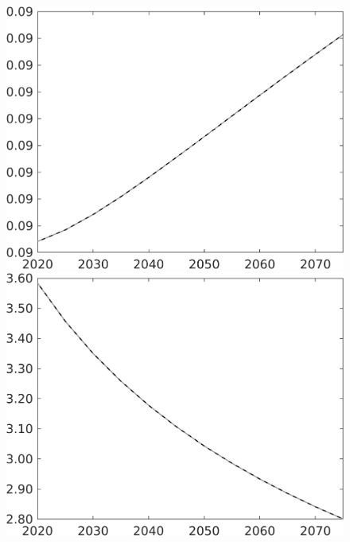 \documentclass[12pt]{article}
\begin{document}
\begin{figure}[h!!]
\begin{minipage}[]{0.32\textwidth}
	\end{minipage}		
	\begin{minipage}[]{0.32\textwidth}
		\includegraphics[width=1\textwidth]{../../codding_model/own_basedOnFried/optimalPol_010922_revision/figures/all_13Sept22/CompTaul_LFBAU_Reg0_pepn_spillover0_nsk1_xgr0_knspil0_sep1_countec0_GovRev0_etaa0.79_lgd0.png}
	\end{minipage}	
	\begin{minipage}[]{0.32\textwidth}
		\includegraphics[width=1\textwidth]{../../codding_model/own_basedOnFried/optimalPol_010922_revision/figures/all_13Sept22/CompTaul_LFBAU_Reg0_pgpftf_spillover0_nsk1_xgr0_knspil0_sep1_countec0_GovRev0_etaa0.79_lgd0.png}

\end{minipage}
\end{figure}
\end{document}
